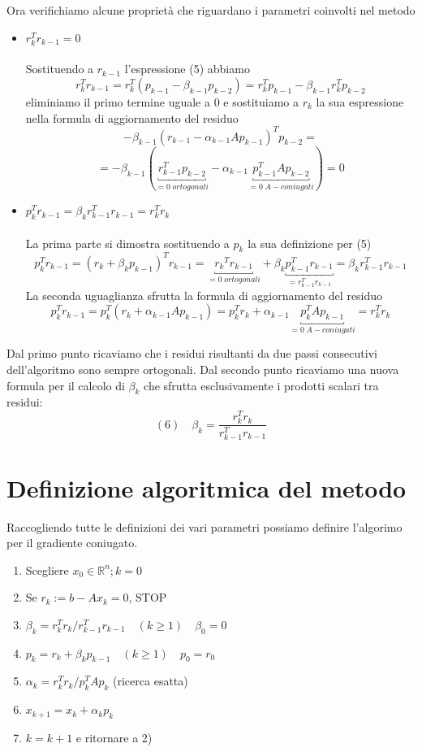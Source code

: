 Ora verifichiamo alcune proprietà che riguardano i parametri coinvolti
nel metodo
\begin{itemize}
\item $r_{k}^{T} r_{k-1}=0$\\ \\ Sostituendo a $r_{k-1}$ l'espressione
(5) abbiamo
$$r_{k}^{T} r_{k-1} =r_{k}^{T} (p_{k-1} - \beta _{k-1} p_{k-2}) =
r_{k}^{T} p_{k-1} - \beta_{k-1}r_{k}^{T} p_{k-2}$$ eliminiamo il primo
termine uguale a 0 e sostituiamo a $r_{k}$ la sua espressione nella
formula di aggiornamento del residuo
 $$ -\beta_{k-1} (r_{k-1} - \alpha_{k-1} A p_{k-1})^{T} p_{k-2}= $$
$$  = -\beta_{k-1} (\underbracket{r_{k-1}^{T} p_{k-2}}_{= 0\;ortogonali} - \alpha_{k-1} \underbracket{p_{k-1}^{T} A p_{k-2}}_{ = 0\; A-coniugati})=0
$$

\item $p_{k}^{T} r_{k-1} = \beta_{k} r_{k-1}^{T} r_{k-1} = r_{k}^{T}
r_{k}$ \\ \\ La prima parte si dimostra sostituendo a $p_{k}$ la sua
definizione per (5)
$$p_{k}^{T} r_{k-1} = 
(r_{k} + \beta_{k} p_{k-1})^{T}r_{k-1} = \underbracket{{r_k}^{T}
r_{k-1}}_{= 0 \; ortogonali} + \beta_k \underbracket{p_{k-1}^{T} r
_{k-1}}_{=r_{k-1}^{T}r_{k-1}} = \beta_{k} r_{k-1}^{T} r_{k-1}
$$
La seconda uguaglianza sfrutta la formula di aggiornamento del residuo
$$ p_{k}^{T}r_{k-1}= p_{k}^{T} (r_{k} + \alpha_{k-1} A p_{k-1}) = p_{k}^{T}r_{k} + 
  \alpha_{k-1} \underbracket{p_{k}^{T} A p_{k-1}}_{= 0\; A-coniugati}
= r_{k}^{T} r_{k}$$

\end{itemize} Dal primo punto ricaviamo che i residui risultanti da
due passi consecutivi dell'algoritmo sono sempre ortogonali.  Dal
secondo punto ricaviamo una nuova formula per il calcolo di
$\beta_{k}$ che sfrutta esclusivamente i prodotti scalari tra
residui:
$$ (6)\quad \beta_{k} = \frac{r_{k}^{T}r_{k}}{r_{k-1}^{T}r_{k-1}}$$ 

\section{Definizione algoritmica del metodo}

Raccogliendo tutte le definizioni dei vari parametri possiamo definire
l'algorimo per il gradiente coniugato.

\begin{enumerate}
 \item Scegliere $x_0 \in \mathbb{R}^{n}; k =0$
 \item Se $r_{k}:= b-A x_{k} = 0$, STOP
 \item $\beta_{k} = r_{k}^{T}r_{k} / r_{k-1}^{T}r_{k-1} \quad (k \geq
1) \quad \beta_{0} = 0 $
 \item $p_{k} = r_{k} + \beta_{k} p_{k-1} \quad (k \geq 1) \quad
p_{0}=r_{0}$
 \item $\alpha_{k} = r_{k}^{T}r_{k}/p_{k}^{T} A p_{k}$ \quad (ricerca
esatta)
 \item $x_{k+1} = x_{k} + \alpha_{k} p_{k}$
 \item $k = k+1$ e ritornare a 2)
\end{enumerate}

